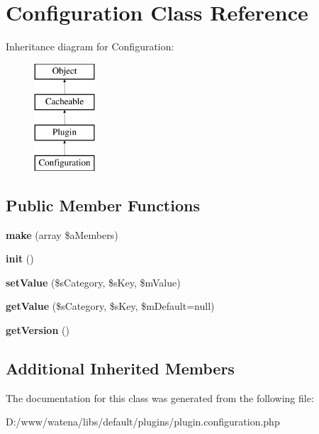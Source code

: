 \hypertarget{class_configuration}{\section{Configuration Class Reference}
\label{class_configuration}
}
Inheritance diagram for Configuration\-:\begin{figure}[H]
\begin{center}
\leavevmode
\includegraphics[height=4.000000cm]{class_configuration}
\end{center}
\end{figure}
\subsection*{Public Member Functions}
\begin{DoxyCompactItemize}
\item 
\hypertarget{class_configuration_a489fc81ded33c1787539ef709fbbe433}{{\bfseries make} (array \$a\-Members)}\label{class_configuration_a489fc81ded33c1787539ef709fbbe433}

\item 
\hypertarget{class_configuration_a60e7bbed108b28bcc72d0f654cfe2562}{{\bfseries init} ()}\label{class_configuration_a60e7bbed108b28bcc72d0f654cfe2562}

\item 
\hypertarget{class_configuration_a3f8a35d86e48aa87fbce3dc0a3a7a537}{{\bfseries set\-Value} (\$s\-Category, \$s\-Key, \$m\-Value)}\label{class_configuration_a3f8a35d86e48aa87fbce3dc0a3a7a537}

\item 
\hypertarget{class_configuration_ae0381085e59ec3a4cccd6b22452752e1}{{\bfseries get\-Value} (\$s\-Category, \$s\-Key, \$m\-Default=null)}\label{class_configuration_ae0381085e59ec3a4cccd6b22452752e1}

\item 
\hypertarget{class_configuration_ade060e72f68566aaecf6d809942aca7b}{{\bfseries get\-Version} ()}\label{class_configuration_ade060e72f68566aaecf6d809942aca7b}

\end{DoxyCompactItemize}
\subsection*{Additional Inherited Members}


The documentation for this class was generated from the following file\-:\begin{DoxyCompactItemize}
\item 
D\-:/www/watena/libs/default/plugins/plugin.\-configuration.\-php\end{DoxyCompactItemize}
